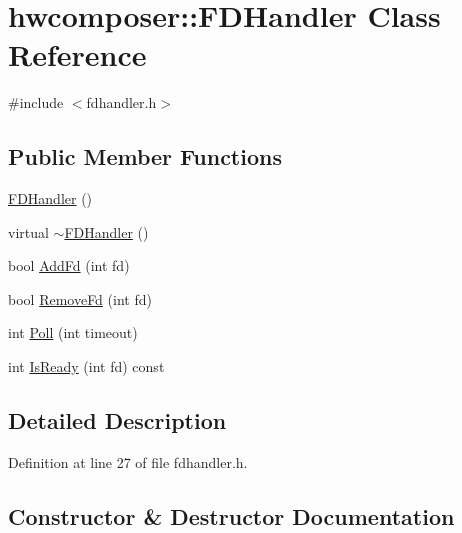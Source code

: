 \hypertarget{classhwcomposer_1_1FDHandler}{}\section{hwcomposer\+:\+:F\+D\+Handler Class Reference}
\label{classhwcomposer_1_1FDHandler}


{\ttfamily \#include $<$fdhandler.\+h$>$}

\subsection*{Public Member Functions}
\begin{DoxyCompactItemize}
\item 
\mbox{\hyperlink{classhwcomposer_1_1FDHandler_aa11b62797841898883bbf3b3f9b55726}{F\+D\+Handler}} ()
\item 
virtual \mbox{\hyperlink{classhwcomposer_1_1FDHandler_ace6e0ca1463839042229d717b9a2ae3a}{$\sim$\+F\+D\+Handler}} ()
\item 
bool \mbox{\hyperlink{classhwcomposer_1_1FDHandler_aee421fa4ae54b7d4fcc352ebea15b4f8}{Add\+Fd}} (int fd)
\item 
bool \mbox{\hyperlink{classhwcomposer_1_1FDHandler_a41262bff4e932281e66b8cebaabced1d}{Remove\+Fd}} (int fd)
\item 
int \mbox{\hyperlink{classhwcomposer_1_1FDHandler_a5ab233d1f474eab69552321e87159a9d}{Poll}} (int timeout)
\item 
int \mbox{\hyperlink{classhwcomposer_1_1FDHandler_ad635c0c7631838aa99e0140c4164425f}{Is\+Ready}} (int fd) const
\end{DoxyCompactItemize}


\subsection{Detailed Description}


Definition at line 27 of file fdhandler.\+h.



\subsection{Constructor \& Destructor Documentation}
\mbox{\label{classhwcomposer_1_1FDHandler_aa11b62797841898883bbf3b3f9b55726}} 
